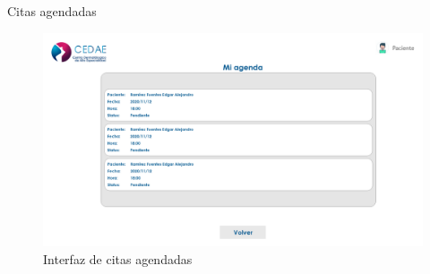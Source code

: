 \documentclass[12pt,letterpaper]{article}
\begin{document}
        Citas agendadas
            \begin{figure}[H]
                \centering
                \includegraphics [scale=0.2]{pac_citas_agendadas}
                \caption{Interfaz de citas agendadas}
            \end{figure}
\end{document}
